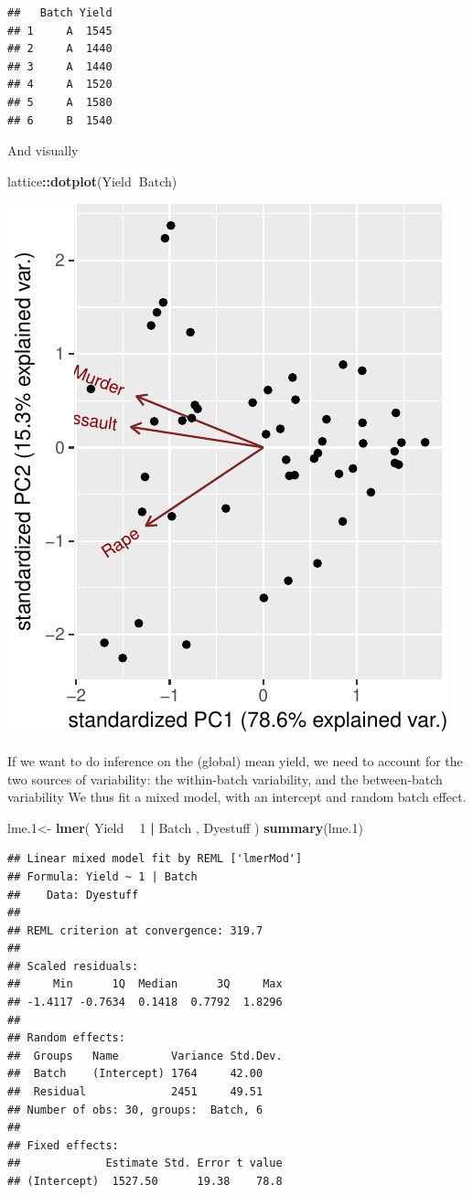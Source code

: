 \documentclass[]{book}
\newenvironment{Shaded}{\begin{snugshade}}{\end{snugshade}}
\newcommand{\KeywordTok}[1]{\textcolor[rgb]{0.13,0.29,0.53}{\textbf{#1}}}
\newcommand{\DecValTok}[1]{\textcolor[rgb]{0.00,0.00,0.81}{#1}}
\newcommand{\StringTok}[1]{\textcolor[rgb]{0.31,0.60,0.02}{#1}}
\newcommand{\OperatorTok}[1]{\textcolor[rgb]{0.81,0.36,0.00}{\textbf{#1}}}
\newcommand{\NormalTok}[1]{#1}
\theoremstyle{definition}
\theoremstyle{definition}
\theoremstyle{definition}
\theoremstyle{remark}
\begin{document}
\begin{verbatim}
##   Batch Yield
## 1     A  1545
## 2     A  1440
## 3     A  1440
## 4     A  1520
## 5     A  1580
## 6     B  1540
\end{verbatim}

And visually

\begin{Shaded}
\begin{Highlighting}[]
\NormalTok{lattice}\OperatorTok{::}\KeywordTok{dotplot}\NormalTok{(Yield}\OperatorTok{~}\NormalTok{Batch)}
\end{Highlighting}
\end{Shaded}

\includegraphics[width=0.5\linewidth]{Rcourse_files/figure-latex/unnamed-chunk-181-1}

If we want to do inference on the (global) mean yield, we need to
account for the two sources of variability: the within-batch
variability, and the between-batch variability We thus fit a mixed
model, with an intercept and random batch effect.

\begin{Shaded}
\begin{Highlighting}[]
\NormalTok{lme.}\DecValTok{1}\NormalTok{<-}\StringTok{ }\KeywordTok{lmer}\NormalTok{( Yield }\OperatorTok{~}\StringTok{ }\DecValTok{1}  \OperatorTok{|}\StringTok{ }\NormalTok{Batch  , Dyestuff )}
\KeywordTok{summary}\NormalTok{(lme.}\DecValTok{1}\NormalTok{)}
\end{Highlighting}
\end{Shaded}

\begin{verbatim}
## Linear mixed model fit by REML ['lmerMod']
## Formula: Yield ~ 1 | Batch
##    Data: Dyestuff
## 
## REML criterion at convergence: 319.7
## 
## Scaled residuals: 
##     Min      1Q  Median      3Q     Max 
## -1.4117 -0.7634  0.1418  0.7792  1.8296 
## 
## Random effects:
##  Groups   Name        Variance Std.Dev.
##  Batch    (Intercept) 1764     42.00   
##  Residual             2451     49.51   
## Number of obs: 30, groups:  Batch, 6
## 
## Fixed effects:
##             Estimate Std. Error t value
## (Intercept)  1527.50      19.38    78.8
\end{verbatim}
\end{document}
